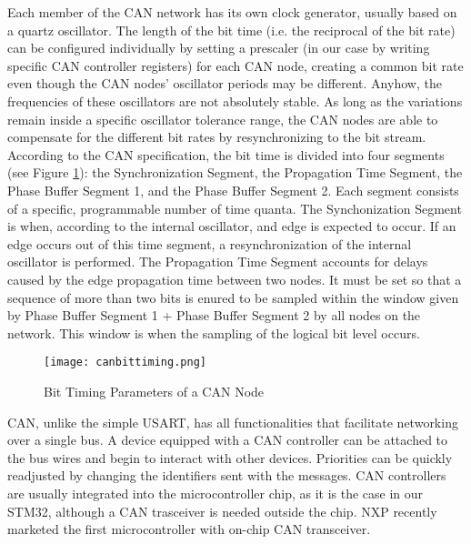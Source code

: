 \documentclass[11pt]{article} %
\begin{document}
Each member of the CAN network has its own clock generator, usually based on a quartz oscillator. The length of the bit time (i.e. the reciprocal of the bit rate) can be configured individually by setting a prescaler (in our case by writing specific CAN controller registers) for each CAN node, creating a common bit rate even though the CAN nodes’ oscillator periods may be different. Anyhow, the frequencies of these oscillators are not absolutely stable. As long as the variations remain inside a specific oscillator tolerance range, the CAN nodes are able to compensate for the different bit rates by resynchronizing to the bit stream. According to the CAN specification, the bit time is divided into four segments (see Figure \ref{canbittiming}): the Synchronization Segment, the Propagation Time Segment, the Phase Buffer Segment 1, and the Phase Buffer Segment 2. Each segment consists of a specific, programmable number of time quanta.
The Synchonization Segment is when, according to the internal oscillator, and edge is expected to occur. If an edge occurs out of this time segment, a resynchronization of the internal oscillator is performed. The Propagation Time Segment accounts for delays caused by the edge propagation time between two nodes. It must be set so that a sequence of more than two bits is enured to be sampled within the window given by Phase Buffer Segment 1 + Phase Buffer Segment 2 by all nodes on the network. This window is when the sampling of the logical bit level occurs.

\begin{figure}[htbp]
\begin{center}
\texttt{[image: canbittiming.png]}
\end{center}
\caption{Bit Timing Parameters of a CAN Node}
\label{canbittiming}
\end{figure}


CAN, unlike the simple USART, has all functionalities that facilitate networking over a single bus. A device equipped with a CAN controller can be attached to the bus wires and begin to interact with other devices. Priorities can be quickly readjusted by changing the identifiers sent with the messages.
CAN controllers are usually integrated into the microcontroller chip, as it is the case in our STM32, although a CAN trasceiver is needed outside the chip. NXP recently marketed the first microcontroller with on-chip CAN transceiver.
\end{document}

